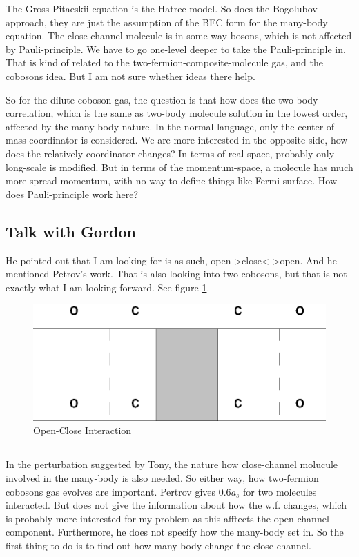 The Gross-Pitaeskii equation is the Hatree model.  So does the Bogolubov approach, they are just the assumption of the BEC form for the many-body equation.  The close-channel molecule is in some way bosons, which is not affected by Pauli-principle.  We have to go one-level deeper to take the Pauli-principle in.   That is kind of related to the two-fermion-composite-molecule gas, and the cobosons idea.  But I am not sure whether ideas there \cite{CobosonPhysicsReports,CobosonCalculation} help. 


So for the dilute coboson gas, the question is that how does the two-body correlation, which is the same as two-body molecule solution in the lowest order, affected by the many-body nature.  In the normal language, only the center of mass coordinator is considered. We are more interested in the opposite side, how does the relatively coordinator changes? In terms of real-space, probably only long-scale is modified.  But in terms of the momentum-space, a molecule has much more spread momentum, with no way to define things like Fermi surface.  How does Pauli-principle work here?

\subsection{Talk with Gordon}
He pointed out that I am looking for is as such, open->close<->open. And he mentioned Petrov's work. \cite{Petrov}  That is also looking into two cobosons, but that is not exactly what I am looking forward.  See figure \ref{fig:openClose}.
\begin{figure}[htb]
	\centering
		\includegraphics[width=.50\textwidth]{image/openClose.eps}
	\caption{Open-Close Interaction\label{fig:openClose}}
	
\end{figure}

\subsection{}
In the perturbation suggested by Tony, the nature how close-channel molucule involved in the many-body is also needed.  So either way, how two-fermion cobosons gas evolves are important.  Pertrov \cite{Petrov} gives $0.6a_s$ for two molecules interacted.  But does not give the information about how the w.f. changes, which is probably more interested for my problem as this afftects the open-channel component.  Furthermore, he does not specify how the many-body set in. 
So the first thing to do is to find out how many-body change the close-channel.   
